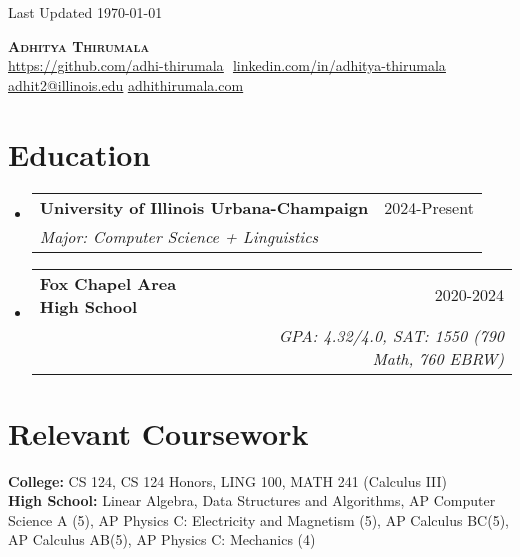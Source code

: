 \documentclass{article}
\makeatletter
\newcommand{\resumeSubheading}[4]{
  \vspace{-2pt}\item
    \begin{tabular*}{0.97\textwidth}[t]{l@{\extracolsep{\fill}}r}
      \textbf{#1} & #2 \\
      \textit{\small#3} & \textit{\small #4} \\
    \end{tabular*}\vspace{-7pt}
}
\newcommand{\resumeSubHeadingListStart}{\begin{itemize}[leftmargin=0.15in, label={}]}
\newcommand{\resumeSubHeadingListEnd}{\end{itemize}}
\makeatother
\begin{document}
\begin{flushright}
  \vspace{-4pt}
  \color{gray}
  \item
  Last Updated \today
\end{flushright}

\vspace{-7pt}

\begin{center}
    \textbf{{\Huge\scshape Adhitya Thirumala}} \\ \vspace{8pt}
    \small 
    \href{https://github.com/adhi-thirumala}{\underline{https://github.com/adhi-thirumala}} $  $
    \href{www.linkedin.com/in/adhitya-thirumala}
    {\underline{linkedin.com/in/adhitya-thirumala}} $  $
    \href{mailto:adhit2@illinois.edu}
    {\underline{adhit2@illinois.edu}}
    \href{https://www.adhithirumala.com}
    {\underline{adhithirumala.com}} $  $


\end{center}

\section{Education}
  \resumeSubHeadingListStart

    \resumeSubheading{University of Illinois Urbana-Champaign} {2024-Present} {Major: Computer Science + Linguistics}{}
    \resumeSubheading
      {Fox Chapel Area High School}{2020-2024}
      {}{GPA: 4.32/4.0, SAT: 1550 (790 Math, 760 EBRW)}
      \resumeSubHeadingListEnd
\vspace{-15pt}
    \section{Relevant Coursework}
    \begin{itemize}[leftmargin=0.15in, label={}]
    \small{\item{
       \textbf{College:}{ CS 124, CS 124 Honors, LING 100, MATH 241 (Calculus III)}\\
     \textbf{High School:}{ Linear Algebra, Data Structures and Algorithms, AP Computer Science A (5), AP Physics C: Electricity and Magnetism (5), AP Calculus BC(5), AP Calculus AB(5), AP Physics C: Mechanics (4)} \\
     
    }}
 \end{itemize}
\end{document}
